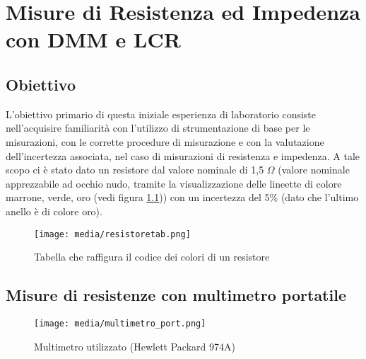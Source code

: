 \chapter{Misure di Resistenza ed Impedenza con DMM e LCR}
\label{chap:prima_prova}


\section*{Obiettivo}
\label{sec:ob_first}

L'obiettivo primario di questa iniziale esperienza di laboratorio consiste nell'acquisire familiarità con l'utilizzo di strumentazione di base per le misurazioni, con le corrette procedure di misurazione e con la valutazione dell'incertezza associata, nel caso di misurazioni di resistenza e impedenza.
\newline \newline
A tale scopo ci è stato dato un resistore dal valore nominale di 1,5 $\Omega$ (valore nominale apprezzabile ad occhio nudo, tramite la visualizzazione delle lineette di colore marrone, verde, oro (vedi figura \ref{fig:resistore})) con un incertezza del 5\% (dato che l'ultimo anello è di colore oro).

\begin{figure}[h]
    \centering
    \texttt{[image: media/resistoretab.png]}
    \caption{Tabella che raffigura il codice dei colori di un resistore}
    \label{fig:resistore}
\end{figure}















\section{Misure di resistenze con multimetro portatile}
\label{sec:mult_port}

\begin{figure}[h]
    \centering
    \texttt{[image: media/multimetro\_port.png]}
    \caption{Multimetro utilizzato (Hewlett Packard 974A)}
    \label{fig:multimetro_port}
\end{figure}


